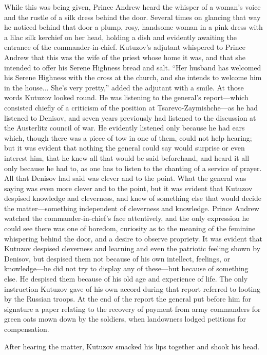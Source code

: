 While this was being given, Prince Andrew heard the whisper of a
woman's voice and the rustle of a silk dress behind the
door. Several times on glancing that way he noticed behind that
door a plump, rosy, handsome woman in a pink dress with a lilac
silk kerchief on her head, holding a dish and evidently awaiting
the entrance of the commander-in-chief.  Kutuzov's adjutant
whispered to Prince Andrew that this was the wife of the priest
whose home it was, and that she intended to offer his Serene
Highness bread and salt. ``Her husband has welcomed his Serene
Highness with the cross at the church, and she intends to welcome
him in the house... She's very pretty,'' added the adjutant with
a smile. At those words Kutuzov looked round. He was listening to
the general's report---which consisted chiefly of a criticism of
the position at Tsarevo-Zaymishche---as he had listened to
Denisov, and seven years previously had listened to the
discussion at the Austerlitz council of war. He evidently
listened only because he had ears which, though there was a piece
of tow in one of them, could not help hearing; but it was evident
that nothing the general could say would surprise or even
interest him, that he knew all that would be said beforehand, and
heard it all only because he had to, as one has to listen to the
chanting of a service of prayer. All that Denisov had said was
clever and to the point. What the general was saying was even
more clever and to the point, but it was evident that Kutuzov
despised knowledge and cleverness, and knew of something else
that would decide the matter---something independent of
cleverness and knowledge. Prince Andrew watched the
commander-in-chief's face attentively, and the only expression he
could see there was one of boredom, curiosity as to the meaning
of the feminine whispering behind the door, and a desire to
observe propriety. It was evident that Kutuzov despised
cleverness and learning and even the patriotic feeling shown by
Denisov, but despised them not because of his own intellect,
feelings, or knowledge---he did not try to display any of
these---but because of something else. He despised them because
of his old age and experience of life. The only instruction
Kutuzov gave of his own accord during that report referred to
looting by the Russian troops. At the end of the report the
general put before him for signature a paper relating to the
recovery of payment from army commanders for green oats mown down
by the soldiers, when landowners lodged petitions for
compensation.

After hearing the matter, Kutuzov smacked his lips together and
shook his head.

